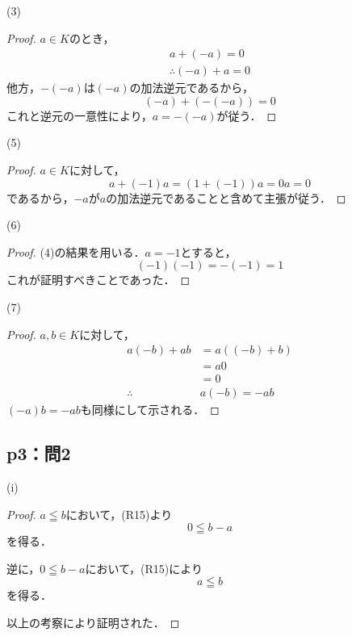 \documentclass[uplatex,dvipdfmx,a4paper,10pt,fleqn]{jsarticle}
\begin{document}
    \begin{itembox}[c]{(3)}
        \begin{proof}
$a \in K$のとき，
\begin{gather*}
    a+(-a)=0 \\
    \therefore (-a)+a =0
\end{gather*}
他方，$-(-a)$は$(-a)$の加法逆元であるから，
\[
    (-a)+(-(-a))=0
\]
これと逆元の一意性により，$a=-(-a)$が従う．
\end{proof}
\end{itembox}
\begin{itembox}[c]{(5)}
    \begin{proof}
    $a \in K$に対して，
    \[
        a+(-1)a=(1+(-1))a =0a =0
    \]
    であるから，$-a$が$a$の加法逆元であることと含めて主張が従う．
    \end{proof}
\end{itembox}
\newpage 
\begin{itembox}[c]{(6)}
    \begin{proof}
    (4)の結果を用いる．$a=-1$とすると，
    \[
        (-1)(-1)=-(-1)=1
    \]
    これが証明すべきことであった．
    \end{proof}
\end{itembox}
\begin{itembox}[c]{(7)}
    \begin{proof}
    $a,b \in K$に対して，
    \begin{align*}
     a(-b)+ab & = a((-b)+b) \\
     & = a0 \\
    & =0 \\
\therefore \quad & a(-b)=-ab 
    \end{align*}
$(-a)b = -ab$も同様にして示される．
\end{proof}
\end{itembox}
%
\newpage\subsection*{p3：問2}

\begin{itembox}[c]{(i)}
    \begin{proof}
        $a \leqq b$において，(R15)より
        \[
            0 \leqq b-a
        \]
        を得る．

        逆に，$0 \leqq b-a$において，(R15)により
        \[
            a \leqq b 
        \]
        を得る．

        以上の考察により証明された．
    \end{proof}
    \end{itembox}
\end{document}
